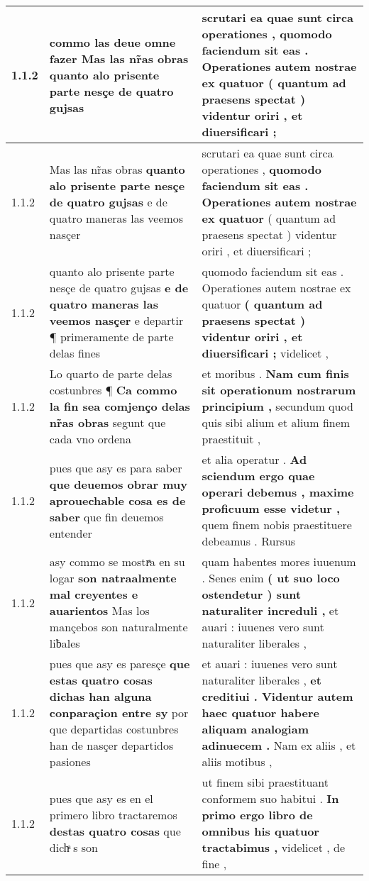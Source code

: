 \begin{tabular}{|p{1cm}|p{6.5cm}|p{6.5cm}|}
1.1.2 & commo las deue omne fazer \textbf{ Mas las nr̃as obras } quanto alo prisente parte nesçe de quatro gujsas & scrutari ea quae sunt circa operationes , \textbf{ quomodo faciendum sit eas . Operationes autem nostrae ex quatuor } ( quantum ad praesens spectat ) videntur oriri , et diuersificari ; \\\hline
1.1.2 & Mas las nr̃as obras \textbf{ quanto alo prisente parte nesçe de quatro gujsas } e de quatro maneras las veemos nasçer & scrutari ea quae sunt circa operationes , \textbf{ quomodo faciendum sit eas . Operationes autem nostrae ex quatuor } ( quantum ad praesens spectat ) videntur oriri , et diuersificari ; \\\hline
1.1.2 & quanto alo prisente parte nesçe de quatro gujsas \textbf{ e de quatro maneras las veemos nasçer } e departir ¶ primeramente de parte delas fines & quomodo faciendum sit eas . Operationes autem nostrae ex quatuor \textbf{ ( quantum ad praesens spectat ) videntur oriri , et diuersificari ; } videlicet , \\\hline
1.1.2 & Lo quarto de parte delas costunbres ¶ \textbf{ Ca commo la fin sea comjenço delas nr̃as obras } segunt que cada vno ordena & et moribus . \textbf{ Nam cum finis sit operationum nostrarum principium , } secundum quod quis sibi alium et alium finem praestituit , \\\hline
1.1.2 & pues que asy es para saber \textbf{ que deuemos obrar muy aprouechable cosa es de saber } que fin deuemos entender & et alia operatur . \textbf{ Ad sciendum ergo quae operari debemus , maxime proficuum esse videtur , } quem finem nobis praestituere debeamus . Rursus \\\hline
1.1.2 & asy commo se mostrͣa en su logar \textbf{ son natraalmente mal creyentes e auarientos } Mas los mançebos son naturalmente liƀales & quam habentes mores iuuenum . Senes enim \textbf{ ( ut suo loco ostendetur ) sunt naturaliter increduli , } et auari : iuuenes vero sunt naturaliter liberales , \\\hline
1.1.2 & pues que asy es paresçe \textbf{ que estas quatro cosas dichas han alguna conparaçion entre sy } por que departidas costunbres han de nasçer departidos pasiones & et auari : iuuenes vero sunt naturaliter liberales , \textbf{ et creditiui . Videntur autem haec quatuor habere aliquam analogiam adinuecem . } Nam ex aliis , et aliis motibus , \\\hline
1.1.2 & pues que asy es en el primero libro tractaremos \textbf{ destas quatro cosas } que dichͣ s son & ut finem sibi praestituant conformem suo habitui . \textbf{ In primo ergo libro de omnibus his quatuor tractabimus , } videlicet , de fine , \\\hline

\end{tabular}
